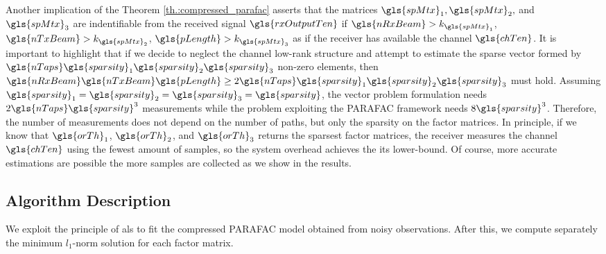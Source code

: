 \documentclass[conference]{IEEEtran}
\begin{document}
Another implication of the Theorem \ref{th.:compressed_parafac} asserts that the matrices
$\gls{spMtx}_1, \gls{spMtx}_2,$ and $\gls{spMtx}_3$ are indentifiable from the
received signal $\gls{rxOutputTen}$ if $\gls{nRxBeam}>k_{\gls{spMtx}_1}$,
$\gls{nTxBeam}>k_{\gls{spMtx}_2}$, $\gls{pLength}>k_{\gls{spMtx}_3}$ as if the
receiver has available the channel $\gls{chTen}$. It is important to highlight
that if we decide to neglect the channel low-rank structure and attempt to
estimate the sparse vector formed by $\gls{nTaps} \gls{sparsity}_1
\gls{sparsity}_2 \gls{sparsity}_3$ non-zero elements, then
$\gls{nRxBeam}\gls{nTxBeam}\gls{pLength} \geq 2 \gls{nTaps}\gls{sparsity}_1\gls{sparsity}_2\gls{sparsity}_3$
must hold. Assuming
$\gls{sparsity}_1=\gls{sparsity}_2=\gls{sparsity}_3=\gls{sparsity}$, the vector
problem formulation needs $2\gls{nTaps}\gls{sparsity}^3$ measurements while the
problem exploiting the \gls{PARAFAC} framework needs $8\gls{sparsity}^3$.
Therefore, the number of measurements does not depend on the number of paths,
but only the sparsity on the factor matrices. In principle, if we know that
$\gls{orTh}_1$, $\gls{orTh}_2$, and $\gls{orTh}_3$ returns the sparsest
factor matrices, the receiver  measures the channel  $\gls{chTen}$ using the fewest
amount of samples, so the system overhead achieves the its lower-bound. Of
course, more accurate estimations are possible the more samples are collected as
we show in the results.






\subsection{Algorithm Description}

We exploit the principle of \gls{als} to fit the compressed \gls{PARAFAC} model
obtained from noisy observations. After this, we compute separately the minimum $l_1$-norm
solution for each factor matrix.
\end{document}
